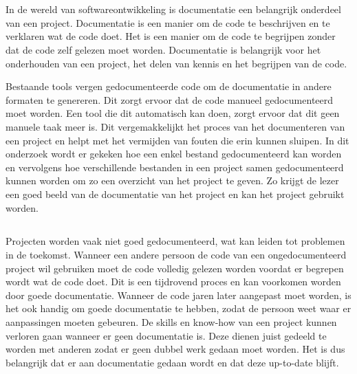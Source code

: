 
\chapter{}%
\label{ch:inleiding}

In de wereld van softwareontwikkeling is documentatie een belangrijk onderdeel van een project.
Documentatie is een manier om de code te beschrijven en te verklaren wat de code doet.
Het is een manier om de code te begrijpen zonder dat de code zelf gelezen moet worden.
Documentatie is belangrijk voor het onderhouden van een project, het delen van kennis en het begrijpen van de code.

Bestaande tools vergen gedocumenteerde code om de documentatie in andere formaten te genereren.
Dit zorgt ervoor dat de code manueel gedocumenteerd moet worden.
Een tool die dit automatisch kan doen, zorgt ervoor dat dit geen manuele taak meer is.
Dit vergemakkelijkt het proces van het documenteren van een project en helpt met het vermijden van fouten die erin kunnen sluipen. 
In dit onderzoek wordt er gekeken hoe een enkel bestand gedocumenteerd kan worden en vervolgens hoe verschillende bestanden in een project samen gedocumenteerd kunnen worden om zo een overzicht van het project te geven.
Zo krijgt de lezer een goed beeld van de documentatie van het project en kan het project gebruikt worden.

\section{}%
\label{sec:probleemstelling}

Projecten worden vaak niet goed gedocumenteerd, wat kan leiden tot problemen in de toekomst. Wanneer een andere persoon de code van een ongedocumenteerd project wil gebruiken moet de code volledig gelezen worden voordat er begrepen wordt wat de code doet. 
Dit is een tijdrovend proces en kan voorkomen worden door goede documentatie.
Wanneer de code jaren later aangepast moet worden, is het ook handig om goede documentatie te hebben, zodat de persoon weet waar er aanpassingen moeten gebeuren.
De skills en know-how van een project kunnen verloren gaan wanneer er geen documentatie is.
Deze dienen juist gedeeld te worden met anderen zodat er geen dubbel werk gedaan moet worden.
Het is dus belangrijk dat er aan documentatie gedaan wordt en dat deze up-to-date blijft.

